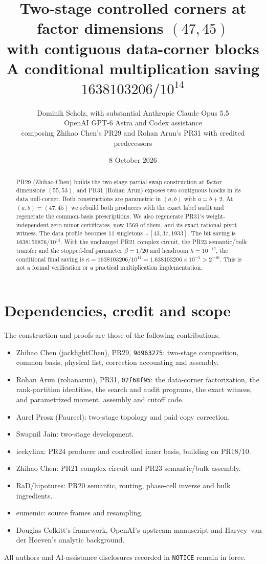 \documentclass[11pt]{article}
\title{Two-stage controlled corners at factor dimensions $(47,45)$\\
with contiguous data-corner blocks\\
\large A conditional multiplication saving $1638103206/10^{14}$}
\author{Dominik Scholz, with substantial Anthropic Claude Opus 5.5\\
OpenAI GPT-6 Astra and Codex assistance\\
\small composing Zhihao Chen's PR29 and Rohan Arun's PR31 with credited predecessors}
\date{8 October 2026}
\begin{document}
\maketitle
\begin{abstract}
PR29 (Zhihao Chen) builds the two-stage partial-swap construction at
factor dimensions $(55,53)$, and PR31 (Rohan Arun) exposes two contiguous
blocks in its data null-corner. Both constructions are parametric in
$(a,b)$ with $a=b+2$. At $(a,b)=(47,45)$ we rebuild both producers with the
exact label audit and regenerate the common-basis prescriptions. We also
regenerate PR31's weight-independent zero-minor certificates, now 1569 of
them, and its exact rational pivot witness. The data profile becomes
$11$ singletons $+[43,37,1933]$. The bit saving is $1638156876/10^{14}$.
With the unchanged PR21 complex circuit, the PR23 semantic/bulk transfer
and the stopped-leaf parameter $\beta=1/20$ and headroom $h=10^{-12}$, the conditional final saving is
$\kappa=1638103206/10^{14}=1.638103206\times10^{-5}>2^{-16}$. This is not a formal
verification or a practical multiplication implementation.
\end{abstract}

\section{Dependencies, credit and scope}
The construction and proofs are those of the following contributions.
\begin{itemize}
\item Zhihao Chen (jacklightChen), PR29, \texttt{9d963275}: two-stage
composition, common basis, physical list, correction accounting and
assembly.
\item Rohan Arun (rohanarun), PR31, \texttt{02f68f95}: the data-corner
factorization, the rank-partition identities, the search and audit
programs, the exact witness, and parametrized moment, assembly and cutoff
code.
\item Aurel Prosz (Paureel): two-stage topology and paid copy correction.
\item Swapnil Jain: two-stage development.
\item icekylinx: PR24 producer and controlled inner basis, building on
PR18/10.
\item Zhihao Chen: PR21 complex circuit and PR23 semantic/bulk assembly.
\item RaD/hipotures: PR20 semantic, routing, phase-cell inverse and bulk
ingredients.
\item eumemic: source frames and resampling.
\item Douglas Colkitt's framework, OpenAI's upstream manuscript and
Harvey--van der Hoeven's analytic background.
\end{itemize}
All authors and AI-assistance disclosures recorded in \texttt{NOTICE}
remain in force.
\end{document}
